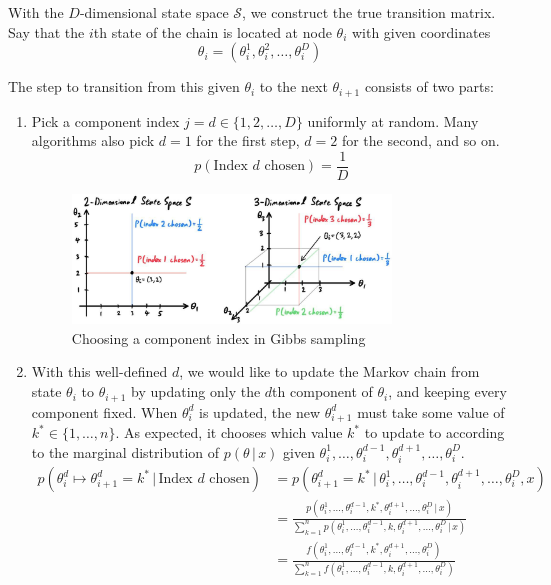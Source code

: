   With the $D$-dimensional state space $\mathcal{S}$, we construct the true transition matrix. Say that the $i$th state of the chain is located at node $\theta_i$ with given coordinates
  \begin{equation}
    \theta_i = (\theta_i^1, \theta_i^2, \ldots, \theta_i^D)
  \end{equation}

  The step to transition from this given $\theta_i$ to the next $\theta_{i+1}$ consists of two parts:
  \begin{enumerate}
    \item Pick a component index $j=d \in \{1, 2, \ldots, D\}$ uniformly at random. Many algorithms also pick $d=1$ for the first step, $d=2$ for the second, and so on.
    \begin{equation}
      p(\text{Index }d \text{ chosen}) = \frac{1}{D}
    \end{equation}
    
    \begin{figure}[H]
      \centering
      \includegraphics[width=0.8\textwidth]{img/choose_index.jpg}
      \caption{Choosing a component index in Gibbs sampling}
    \end{figure}

    \item With this well-defined $d$, we would like to update the Markov chain from state $\theta_i$ to $\theta_{i+1}$ by updating only the $d$th component of $\theta_i$, and keeping every component fixed. When $\theta_i^d$ is updated, the new $\theta_{i+1}^d$ must take some value of $k^* \in \{1, \ldots, n\}$. As expected, it chooses which value $k^*$ to update to according to the marginal distribution of $p(\theta\,|\,x)$ given $\theta_i^1, \ldots, \theta_i^{d-1}, \theta_i^{d+1}, \ldots, \theta_i^D$.
    \begin{align*}
      p(\theta_i^d \mapsto \theta_{i+1}^d = k^*\,|\, \text{Index } d \text{ chosen}) & = p(\theta_{i+1}^d = k^* \,|\,\theta_i^1, \ldots, \theta_i^{d-1}, \theta_i^{d+1}, \ldots, \theta_i^D, x) \\
      & = \frac{p(\theta_i^1, \ldots, \theta_i^{d-1}, k^*, \theta_i^{d+1}, \ldots, \theta_i^D\,|\,x)}{\sum_{k=1}^n p(\theta_i^1, \ldots, \theta_i^{d-1}, k, \theta_i^{d+1}, \ldots, \theta_i^D\,|\,x)} \\
      & = \frac{f(\theta_i^1, \ldots, \theta_i^{d-1}, k^*, \theta_i^{d+1}, \ldots, \theta_i^D)}{\sum_{k=1}^n f(\theta_i^1, \ldots, \theta_i^{d-1}, k, \theta_i^{d+1}, \ldots, \theta_i^D)}
    \end{align*}


\end{enumerate}
